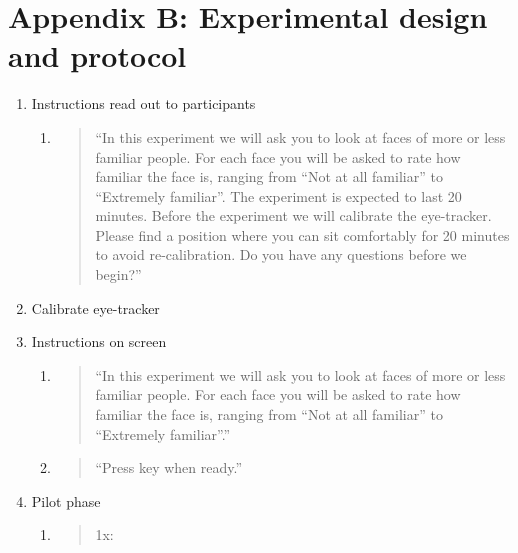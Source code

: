 \documentclass{llncs}
\begin{document}
\section*{Appendix B: Experimental design and protocol}
\label{appendix:experiment}
\begin{enumerate}
\def\labelenumi{\arabic{enumi})}
\item
  Instructions read out to participants

  \begin{enumerate}
  \def\labelenumii{\alph{enumii})}
  \item
    \begin{quote}
    ``In this experiment we will ask you to look at faces of more or
    less familiar people. For each face you will be asked to rate how
    familiar the face is, ranging from ``Not at all familiar'' to
    ``Extremely familiar''. The experiment is expected to last 20
    minutes. Before the experiment we will calibrate the eye-tracker.
    Please find a position where you can sit comfortably for 20 minutes
    to avoid re-calibration. Do you have any questions before we
    begin?''
    \end{quote}
  \end{enumerate}
\item
  Calibrate eye-tracker
\item
  Instructions on screen

  \begin{enumerate}
  \def\labelenumii{\alph{enumii})}
  \item
    \begin{quote}
    ``In this experiment we will ask you to look at faces of more or
    less familiar people. For each face you will be asked to rate how
    familiar the face is, ranging from ``Not at all familiar'' to
    ``Extremely familiar''.''
    \end{quote}
  \item
    \begin{quote}
    ``Press key when ready.''
    \end{quote}
  \end{enumerate}
\item
  Pilot phase

  \begin{enumerate}
  \def\labelenumii{\alph{enumii})}
  \item
    \begin{quote}
    1x:
    \end{quote}


\end{enumerate}
\end{enumerate}
\end{document}
